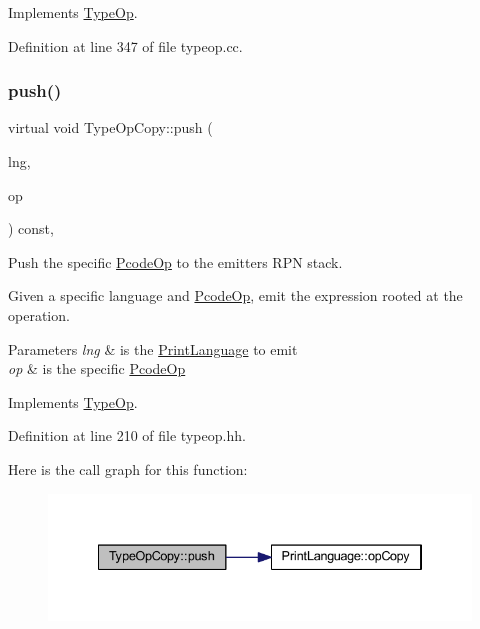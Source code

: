 Implements \mbox{\hyperlink{class_type_op_a60717e486917a30cc7cb6e3ce02585e1}{Type\+Op}}.



Definition at line 347 of file typeop.\+cc.

\mbox{\label{class_type_op_copy_a630b0d476ae53202c12db4e466cfad4f}} 
\subsubsection{\texorpdfstring{push()}{push()}}
{\footnotesize\ttfamily virtual void Type\+Op\+Copy\+::push (\begin{DoxyParamCaption}\item[{\mbox{\hyperlink{class_print_language}{Print\+Language}} $\ast$}]{lng,  }\item[{const \mbox{\hyperlink{class_pcode_op}{Pcode\+Op}} $\ast$}]{op }\end{DoxyParamCaption}) const\hspace{0.3cm}{\ttfamily [inline]}, {\ttfamily [virtual]}}



Push the specific \mbox{\hyperlink{class_pcode_op}{Pcode\+Op}} to the emitter\textquotesingle{}s R\+PN stack. 

Given a specific language and \mbox{\hyperlink{class_pcode_op}{Pcode\+Op}}, emit the expression rooted at the operation. 
\begin{DoxyParams}{Parameters}
{\em lng} & is the \mbox{\hyperlink{class_print_language}{Print\+Language}} to emit \\
\hline
{\em op} & is the specific \mbox{\hyperlink{class_pcode_op}{Pcode\+Op}} \\
\hline
\end{DoxyParams}


Implements \mbox{\hyperlink{class_type_op_ac9c9544203ed74dabe6ac662b653b2af}{Type\+Op}}.



Definition at line 210 of file typeop.\+hh.

Here is the call graph for this function\+:
\nopagebreak
\begin{figure}[H]
\begin{center}
\leavevmode
\includegraphics[width=334pt]{class_type_op_copy_a630b0d476ae53202c12db4e466cfad4f_cgraph}
\end{center}
\end{figure}


